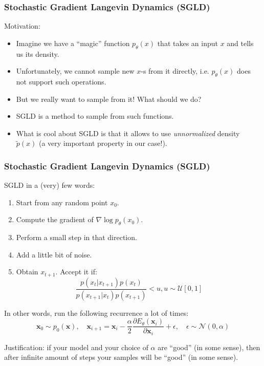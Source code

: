 \documentclass[10pt]{beamer}
\begin{document}
\begin{frame}    
    \frametitle{Stochastic Gradient Langevin Dynamics (SGLD)}
    Motivation:
    \begin{itemize}
        \item\pause Imagine we have a ``magic'' function $p_\theta(x)$ that takes an input $x$ and tells us its density.
        \item\pause Unfortunately, we cannot sample new $x$-s from it directly, i.e. $p_\theta(x)$ does not support such operations.
        \item\pause But we really want to sample from it! What should we do?
        \item\pause SGLD is a method to sample from such functions.
        \item\pause What is cool about SGLD is that it allows to use \textit{unnormalized} density $\tilde{p}(x)$ (a very important property in our case!).
    \end{itemize}
\end{frame}

\begin{frame}
    \frametitle{Stochastic Gradient Langevin Dynamics (SGLD)}
    SGLD in a (very) few words:
    \begin{enumerate}
        \item\pause Start from any random point $x_0$.
        \item\pause Compute the gradient of $\nabla \log p_\theta(x_0)$.
        \item\pause Perform a small step in that direction.
        \item\pause Add a little bit of noise.
        \item\pause Obtain $x_{t+1}$. Accept it if:
        \begin{equation}
\frac{p\left(x_{t} | x_{t+1}\right) p\left(x_{t}\right)}{p\left(x_{t+1} | x_{t}\right) p\left(x_{t+1}\right)}<u, u \sim \mathcal{U}[0,1]
\end{equation}
    \end{enumerate}
    \pause In other words, run the following recurrence a lot of times:
\begin{equation}
\mathbf{x}_{0} \sim p_{0}(\mathbf{x}), \quad \mathbf{x}_{i+1}=\mathbf{x}_{i}-\frac{\alpha}{2} \frac{\partial E_{\theta}\left(\mathbf{x}_{i}\right)}{\partial \mathbf{x}_{i}}+\epsilon, \quad \epsilon \sim \mathcal{N}(0, \alpha)
\end{equation}

\pause Justification: if your model and your choice of $\alpha$ are ``good'' (in some sense), then after infinite amount of steps your samples will be ``good'' (in some sense).

\end{frame}
\end{document}
